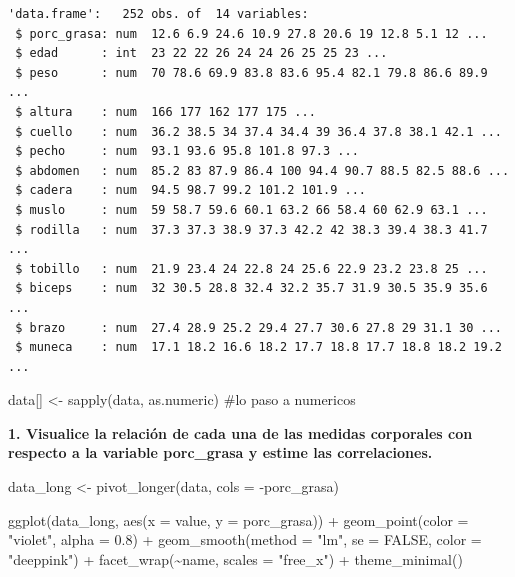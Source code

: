 \documentclass[
  letterpaper,
  DIV=11,
  numbers=noendperiod]{scrartcl}
\newenvironment{Shaded}{\begin{snugshade}}{\end{snugshade}}
\newcommand{\AttributeTok}[1]{\textcolor[rgb]{0.40,0.45,0.13}{#1}}
\newcommand{\CommentTok}[1]{\textcolor[rgb]{0.37,0.37,0.37}{#1}}
\newcommand{\ConstantTok}[1]{\textcolor[rgb]{0.56,0.35,0.01}{#1}}
\newcommand{\FloatTok}[1]{\textcolor[rgb]{0.68,0.00,0.00}{#1}}
\newcommand{\FunctionTok}[1]{\textcolor[rgb]{0.28,0.35,0.67}{#1}}
\newcommand{\NormalTok}[1]{\textcolor[rgb]{0.00,0.23,0.31}{#1}}
\newcommand{\OtherTok}[1]{\textcolor[rgb]{0.00,0.23,0.31}{#1}}
\newcommand{\SpecialCharTok}[1]{\textcolor[rgb]{0.37,0.37,0.37}{#1}}
\newcommand{\StringTok}[1]{\textcolor[rgb]{0.13,0.47,0.30}{#1}}
\begin{document}
\begin{verbatim}
'data.frame':   252 obs. of  14 variables:
 $ porc_grasa: num  12.6 6.9 24.6 10.9 27.8 20.6 19 12.8 5.1 12 ...
 $ edad      : int  23 22 22 26 24 24 26 25 25 23 ...
 $ peso      : num  70 78.6 69.9 83.8 83.6 95.4 82.1 79.8 86.6 89.9 ...
 $ altura    : num  166 177 162 177 175 ...
 $ cuello    : num  36.2 38.5 34 37.4 34.4 39 36.4 37.8 38.1 42.1 ...
 $ pecho     : num  93.1 93.6 95.8 101.8 97.3 ...
 $ abdomen   : num  85.2 83 87.9 86.4 100 94.4 90.7 88.5 82.5 88.6 ...
 $ cadera    : num  94.5 98.7 99.2 101.2 101.9 ...
 $ muslo     : num  59 58.7 59.6 60.1 63.2 66 58.4 60 62.9 63.1 ...
 $ rodilla   : num  37.3 37.3 38.9 37.3 42.2 42 38.3 39.4 38.3 41.7 ...
 $ tobillo   : num  21.9 23.4 24 22.8 24 25.6 22.9 23.2 23.8 25 ...
 $ biceps    : num  32 30.5 28.8 32.4 32.2 35.7 31.9 30.5 35.9 35.6 ...
 $ brazo     : num  27.4 28.9 25.2 29.4 27.7 30.6 27.8 29 31.1 30 ...
 $ muneca    : num  17.1 18.2 16.6 18.2 17.7 18.8 17.7 18.8 18.2 19.2 ...
\end{verbatim}

\begin{Shaded}
\begin{Highlighting}[]
\NormalTok{data[] }\OtherTok{\textless{}{-}} \FunctionTok{sapply}\NormalTok{(data, as.numeric) }\CommentTok{\#lo paso a numericos}
\end{Highlighting}
\end{Shaded}

\textbf{1. Visualice la relación de cada una de las medidas corporales
con respecto a la variable porc\_grasa y estime las correlaciones.}

\begin{Shaded}
\begin{Highlighting}[]
\NormalTok{data\_long }\OtherTok{\textless{}{-}} \FunctionTok{pivot\_longer}\NormalTok{(data, }\AttributeTok{cols =} \SpecialCharTok{{-}}\NormalTok{porc\_grasa)}

\FunctionTok{ggplot}\NormalTok{(data\_long, }\FunctionTok{aes}\NormalTok{(}\AttributeTok{x =}\NormalTok{ value, }\AttributeTok{y =}\NormalTok{ porc\_grasa)) }\SpecialCharTok{+}
  \FunctionTok{geom\_point}\NormalTok{(}\AttributeTok{color =} \StringTok{"violet"}\NormalTok{, }\AttributeTok{alpha =} \FloatTok{0.8}\NormalTok{) }\SpecialCharTok{+}
  \FunctionTok{geom\_smooth}\NormalTok{(}\AttributeTok{method =} \StringTok{"lm"}\NormalTok{, }\AttributeTok{se =} \ConstantTok{FALSE}\NormalTok{, }\AttributeTok{color =} \StringTok{"deeppink"}\NormalTok{) }\SpecialCharTok{+}
  \FunctionTok{facet\_wrap}\NormalTok{(}\SpecialCharTok{\textasciitilde{}}\NormalTok{name, }\AttributeTok{scales =} \StringTok{"free\_x"}\NormalTok{) }\SpecialCharTok{+}
  \FunctionTok{theme\_minimal}\NormalTok{() }
\end{Highlighting}
\end{Shaded}
\end{document}
